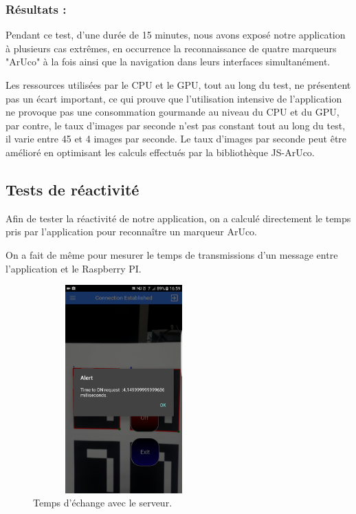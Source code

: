 \documentclass[12pt,a4paper]{article}
\begin{document}
\subsubsection*{Résultats :}
Pendant ce test, d'une durée de 15 minutes, nous avons exposé notre application à plusieurs cas extrêmes, en occurrence la reconnaissance de quatre marqueurs "ArUco" à la fois ainsi que la navigation dans leurs interfaces simultanément.\par
Les ressources utilisées par le CPU et le GPU, tout au long du test, ne présentent pas un écart important, ce qui prouve que l'utilisation intensive de l'application ne provoque pas une consommation gourmande au niveau du CPU et du GPU, par contre, le taux d'images par seconde n'est pas constant tout au long du test, il varie entre 45 et 4 images par seconde. Le taux d'images par seconde peut être amélioré en optimisant les calculs effectués par la bibliothèque JS-ArUco.  
\subsection{Tests de réactivité}
Afin de tester la réactivité de notre application, on a calculé directement le temps pris par l'application pour reconnaître un marqueur ArUco.\par
On a fait de même pour mesurer le temps de transmissions d'un message entre l'application et le Raspberry PI.
\begin{figure}[H]
  \centering
    \includegraphics[width = 7cm,height=8cm]{17.png}
     \caption{Temps d’échange avec le serveur.}
     \label{fig29}
\end{figure}
\end{document}
